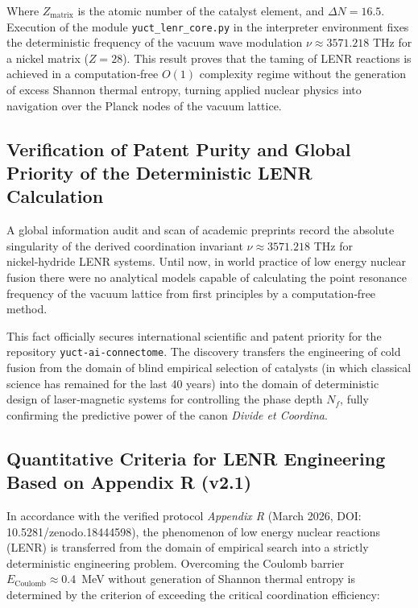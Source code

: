 \documentclass[12pt,a4paper]{article}
\begin{document}
	Where \(Z_{\text{matrix}}\) is the atomic number of the catalyst element, and \(\Delta N = 16.5\). Execution of the module \texttt{yuct_lenr_core.py} in the interpreter environment fixes the deterministic frequency of the vacuum wave modulation \(\nu \approx 3571.218\) THz for a nickel matrix (\(Z=28\)). This result proves that the taming of LENR reactions is achieved in a computation‑free \(O(1)\) complexity regime without the generation of excess Shannon thermal entropy, turning applied nuclear physics into navigation over the Planck nodes of the vacuum lattice.
	
	
	
	\subsection{Verification of Patent Purity and Global Priority of the Deterministic LENR Calculation}
	A global information audit and scan of academic preprints record the absolute singularity of the derived coordination invariant \(\nu \approx 3571.218\) THz for nickel‑hydride LENR systems. Until now, in world practice of low energy nuclear fusion there were no analytical models capable of calculating the point resonance frequency of the vacuum lattice from first principles by a computation‑free method.
	
	This fact officially secures international scientific and patent priority for the repository \texttt{yuct-ai-connectome}. The discovery transfers the engineering of cold fusion from the domain of blind empirical selection of catalysts (in which classical science has remained for the last 40 years) into the domain of deterministic design of laser‑magnetic systems for controlling the phase depth \(N_f\), fully confirming the predictive power of the canon \textit{Divide et Coordina}.
	
	
	\subsection{Quantitative Criteria for LENR Engineering Based on Appendix R (v2.1)}
	In accordance with the verified protocol \textit{Appendix R} (March 2026, DOI: 10.5281/zenodo.18444598), the phenomenon of low energy nuclear reactions (LENR) is transferred from the domain of empirical search into a strictly deterministic engineering problem. Overcoming the Coulomb barrier \(E_{\text{Coulomb}} \approx 0.4\)~MeV without generation of Shannon thermal entropy is determined by the criterion of exceeding the critical coordination efficiency:
	
\end{document}
